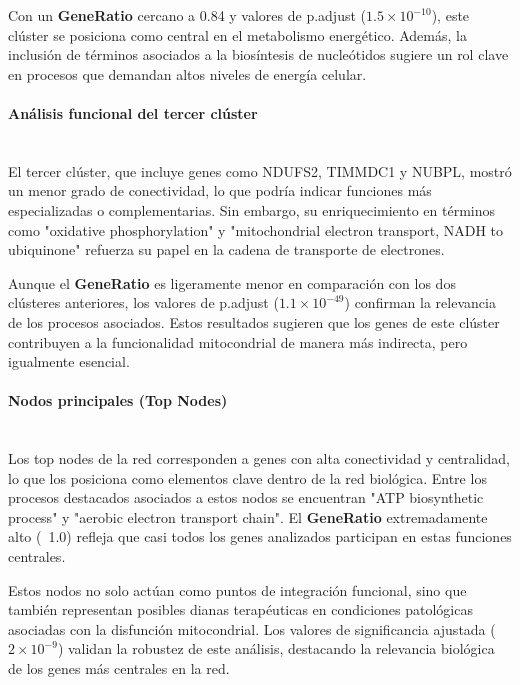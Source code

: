 Con un \textbf{GeneRatio} cercano a 0.84 y valores de p.adjust (\( 1.5 \times 10^{-10} \)), este clúster se posiciona como central en el metabolismo energético. Además, la inclusión de términos asociados a la biosíntesis de nucleótidos sugiere un rol clave en procesos que demandan altos niveles de energía celular.

\paragraph{Análisis funcional del tercer clúster} \mbox{}\\

El tercer clúster, que incluye genes como NDUFS2, TIMMDC1 y NUBPL, mostró un menor grado de conectividad, lo que podría indicar funciones más especializadas o complementarias. Sin embargo, su enriquecimiento en términos como "oxidative phosphorylation" y "mitochondrial electron transport, NADH to ubiquinone" refuerza su papel en la cadena de transporte de electrones.

Aunque el \textbf{GeneRatio} es ligeramente menor en comparación con los dos clústeres anteriores, los valores de p.adjust (\( 1.1 \times 10^{-49} \)) confirman la relevancia de los procesos asociados. Estos resultados sugieren que los genes de este clúster contribuyen a la funcionalidad mitocondrial de manera más indirecta, pero igualmente esencial.

\paragraph{Nodos principales (Top Nodes)} \mbox{}\\

Los top nodes de la red corresponden a genes con alta conectividad y centralidad, lo que los posiciona como elementos clave dentro de la red biológica. Entre los procesos destacados asociados a estos nodos se encuentran "ATP biosynthetic process" y "aerobic electron transport chain". El \textbf{GeneRatio} extremadamente alto (~1.0) refleja que casi todos los genes analizados participan en estas funciones centrales.

Estos nodos no solo actúan como puntos de integración funcional, sino que también representan posibles dianas terapéuticas en condiciones patológicas asociadas con la disfunción mitocondrial. Los valores de significancia ajustada (\( 2 \times 10^{-9} \)) validan la robustez de este análisis, destacando la relevancia biológica de los genes más centrales en la red.

